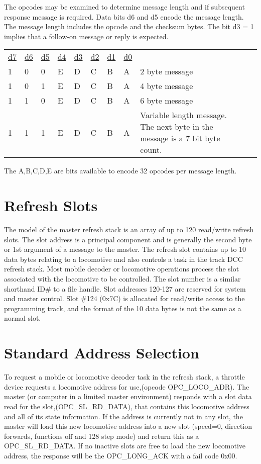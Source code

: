 The opcodes may be examined to determine message length and if subsequent response message is required. Data bits d6 and d5 encode the message length. The message length includes the opcode and the checksum bytes. The bit d3 = 1 implies that a follow-on message or reply is expected.

\begin{tabular}{p{0.05\linewidth} p{0.05\linewidth}  p{0.05\linewidth}  p{0.05\linewidth}  p{0.05\linewidth}  p{0.05\linewidth}  p{0.05\linewidth}  p{0.05\linewidth} p{0.5\linewidth} p{0.5\linewidth}} 
\underline{d7} & \underline{d6} & \underline{d5} & \underline{d4} & \underline{d3} & \underline{d2} & \underline{d1} & \underline{d0} & \\
1 & 0 & 0 & E & D & C & B & A & 2 byte message\\
1 & 0 & 1 & E & D & C & B & A & 4 byte message\\
1 & 1 & 0 & E & D & C & B & A & 6 byte message\\
1 & 1 & 1 & E & D & C & B & A & Variable length message. The next byte in the message is a 7 bit byte count.\\
\end{tabular}

The A,B,C,D,E are bits available to encode 32 opcodes per message length.

\section{Refresh Slots}
The model of the master refresh stack is an array of up to 120 read/write refresh slots. The slot address is a principal component and is generally the second byte or 1st argument of a message to the master. The refresh slot contains up to 10 data bytes relating to a locomotive and also controls a task in the track DCC refresh stack. Most mobile decoder or locomotive operations process the slot associated with the locomotive to be controlled. The slot number is a similar shorthand ID\# to a file handle. Slot addresses 120-127 are reserved for system and master control. Slot \#124 (0x7C) is allocated for read/write access to the programming track, and the format of the 10 data bytes is not the same as a normal slot. 

\section{Standard Address Selection}

To request a mobile or locomotive decoder task in the refresh stack, a throttle device requests a locomotive address for use,(opcode OPC\_LOCO\_ADR). The master (or computer in a limited master environment) responds with a slot data read for the slot,(OPC\_SL\_RD\_DATA), that contains this locomotive address and all of its state information. If the address is currently not in any slot, the master will load this new locomotive address into a new slot (speed=0, direction forwards, functions off and 128 step mode) and return this as a OPC\_SL\_RD\_DATA. If no inactive slots are free to load the new locomotive address, the response will be the OPC\_LONG\_ACK with a fail code 0x00.

